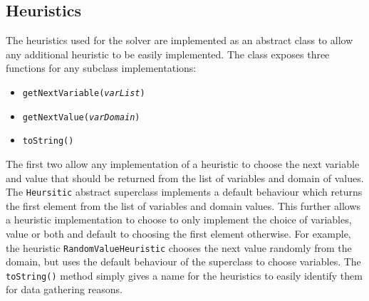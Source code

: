\documentclass{article}
\begin{document}
\subsection{Heuristics}\label{sec:heuristics}
The heuristics used for the solver are implemented as an abstract class to allow any additional heuristic to be easily implemented. The class exposes three functions for any subclass implementations:
\begin{itemize}
\item \texttt{getNextVariable(\textit{varList})}
\item \texttt{getNextValue(\textit{varDomain})}
\item \texttt{toString()}
\end{itemize}
The first two allow any implementation of a heuristic to choose the next variable and value that should be returned from the list of variables and domain of values. The \texttt{Heursitic} abstract superclass implements a default behaviour which returns the first element from the list of variables and domain values. This further allows a heuristic implementation to choose to only implement the choice of variables, value or both and default to choosing the first element otherwise. For example, the heuristic \texttt{RandomValueHeuristic} chooses the next value randomly from the domain, but uses the default behaviour of the superclass to choose variables. 
\n
The \texttt{toString()} method simply gives a name for the heuristics to easily identify them for data gathering reasons. 
\end{document}
